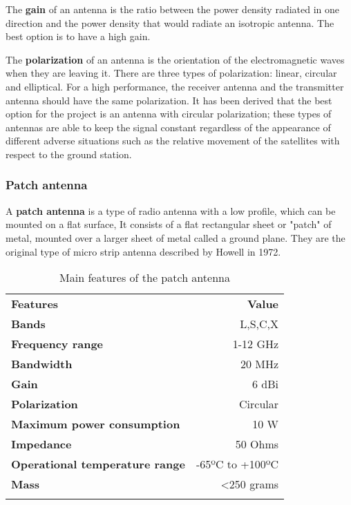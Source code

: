 The \textbf{gain} of an antenna is the ratio between the power density radiated in one direction and the power density that would radiate an isotropic antenna. The best option is to have a high gain. 

The \textbf{polarization} of an antenna is the orientation of the electromagnetic waves when they are leaving it. There are three types of polarization: linear, circular and elliptical. For a high performance, the receiver antenna and the transmitter antenna should have the same polarization. It has been derived that the best option for the project is an antenna with circular polarization; these types of antennas are able to keep the signal constant regardless of the appearance of different adverse situations such as the relative movement of the satellites with respect to the ground station. 

\subsubsection{Patch antenna}
A \textbf{patch antenna} is a type of radio antenna with a low profile, which can be mounted on a flat surface, It consists of a flat rectangular sheet or "patch" of metal, mounted over a larger sheet of metal called a ground plane. They are the original type of micro strip antenna described by Howell in 1972. \cite{patch}

\begin{longtable}{| l | r |}

\hline
\rowcolor[gray]{0.60} \multicolumn{2}{|c|}{\textbf{Patch antenna AntDevCo}} \\
\hline

\hline
\rowcolor[gray]{0.75}	\textbf{Features} &  \textbf{Value}   \\
\hline

\cellcolor[gray]{0.85} \textbf{Bands} & L,S,C,X  \\
\cellcolor[gray]{0.85} \textbf{Frequency range} & 1-12 GHz  \\
\cellcolor[gray]{0.85} \textbf{Bandwidth} & 20 MHz \\
\cellcolor[gray]{0.85} \textbf{Gain} & 6 dBi  \\
\cellcolor[gray]{0.85} \textbf{Polarization} & Circular \\
\cellcolor[gray]{0.85} \textbf{Maximum power consumption} & 10 W \\
\cellcolor[gray]{0.85} \textbf{Impedance} & 50 Ohms \\
\cellcolor[gray]{0.85} \textbf{Operational temperature range} & -65ºC to +100ºC \\
\cellcolor[gray]{0.85} \textbf{Mass} & <250 grams \\
\hline
\caption{Main features of the patch antenna}
\label{patchantenna}
\end{longtable}


